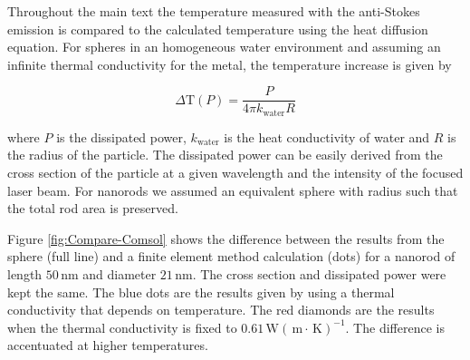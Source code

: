 \documentclass[journal=nalefd,manuscript=letter]{achemso}
\newcommand{\K}{\ensuremath{\,\textrm{K}}}
\newcommand{\nm}{\ensuremath{\,\textrm{nm}}}
\newcommand{\m}{\ensuremath{\,\textrm{m}}}
\newcommand{\W}{\ensuremath{\,\textrm{W}}}
\begin{document}
Throughout the main text the temperature measured with the anti-Stokes emission
is compared to the calculated temperature using the heat diffusion
equation. For spheres in an homogeneous water environment and assuming an infinite
thermal conductivity for the metal, the temperature increase is given by

\begin{equation}
	\Delta \textrm{T}(P) = \frac{P}{4\pi k_{\textrm{water}} R}
\end{equation}

\noindent where $P$ is the dissipated power, $k_{\textrm{water}}$ is the heat
conductivity of water and $R$ is the radius of the particle.\cite{Baffou2013} 
The dissipated power can be
easily derived from the cross section of the particle at a given wavelength and
the intensity of the focused laser beam. For nanorods we assumed an
equivalent sphere with radius such that the total rod area is preserved.

Figure \ref{fig:Compare-Comsol} shows the difference between the results from
the sphere (full line) and a finite element method calculation
(dots) for a nanorod of length $50\nm$ and diameter $21\nm$. The cross section
and dissipated power were kept the same. The blue dots are the results given
by using a thermal conductivity that depends on temperature. 
The red diamonds are the results when the thermal
conductivity is fixed to $0.61 \W(\m\cdot\K)^{-1}$. The difference is
accentuated at higher temperatures.


 
\end{document}
